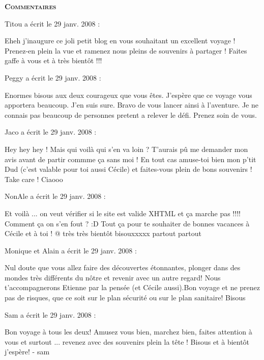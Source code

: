 \bigskip
\textbf{\textsc{Commentaires}}

\medskip
Titou a écrit le 29 janv. 2008 :
\begin{displayquote}
Eheh j'inaugure ce joli petit blog en vous souhaitant un excellent voyage ! Prenez-en plein la vue et ramenez nous pleins de souvenirs à partager ! Faites gaffe à vous et à très bientôt !!!
\end{displayquote}

\medskip
Peggy a écrit le 29 janv. 2008 :
\begin{displayquote}
Enormes bisous aux deux courageux que vous êtes. J'espère que ce voyage vous apportera beaucoup. J'en suis sure. Bravo de vous lancer ainsi à l'aventure. Je ne connais pas beaucoup de personnes pretent a relever le défi. Prenez soin de vous.
\end{displayquote}

\medskip
Jaco a écrit le 29 janv. 2008 :
\begin{displayquote}
Hey hey hey !
Mais qui voilà qui s'en va loin ? T'aurais pû me demander mon avis avant de partir commme ça sans moi !
En tout cas amuse-toi bien mon p'tit Dud (c'est valable pour toi aussi Cécile) et faites-vous plein de bons souvenirs !
Take care !
Ciaooo
\end{displayquote}

\medskip
NonAle a écrit le 29 janv. 2008 :
\begin{displayquote}
Et voilà ... on veut vérifier si le site est valide XHTML et ça marche pas !!!! Comment ça on s'en fout ? :D
Tout ça pour te souhaiter de bonnes vacances à Cécile et à toi !
@ très très bientôt
bisouxxxxx partout partout
\end{displayquote}

\medskip
Monique et Alain a écrit le 29 janv. 2008 :
\begin{displayquote}
Nul doute que vous allez faire des découvertes étonnantes, plonger dans des mondes très différents du nôtre et revenir avec un autre regard! Nous t'accompagnerons Etienne par la pensée (et Cécile aussi).Bon voyage et ne prenez pas de risques, que ce soit sur le plan sécurité ou sur le plan sanitaire!
Bisous
\end{displayquote}

\medskip
Sam a écrit le 29 janv. 2008 :
\begin{displayquote}
Bon voyage à tous les deux!
Amusez vous bien, marchez bien, faites attention à vous et surtout ... revenez avec des souvenirs plein la tête !
Bisous et à bientôt j'espère!
- sam
\end{displayquote}

